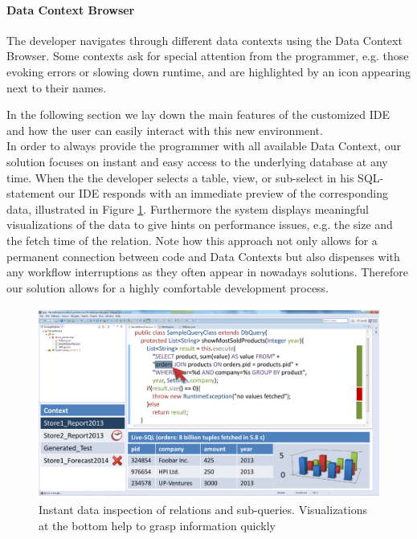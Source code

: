 \paragraph{Data Context Browser} The developer navigates through different data contexts using the Data Context Browser. Some contexts ask for special attention from the programmer, e.g. those evoking errors or slowing down runtime, and are highlighted by an icon appearing next to their names. %

In the following section we lay down the main features of the customized IDE and how the user can easily interact with this new environment.\\
In order to always provide the programmer with all available Data Context, our solution focuses on instant and easy access to the underlying database at any time. When the the developer selects a table, view, or sub-select in his SQL-statement our IDE responds with an immediate preview of the corresponding data, illustrated in Figure \ref{fig:final_prototype_instant}. Furthermore the system displays meaningful visualizations of the data to give hints on performance issues, e.g. the size and the fetch time of the relation. Note how this approach not only allows for a permanent connection between code and Data Contexts but also dispenses with any workflow interruptions as they often appear in nowadays solutions. Therefore our solution allows for a highly comfortable development process.\\
\begin{figure}
\begin{centering}
    \includegraphics[width=1.0\linewidth]{images/instant}
    \caption{Instant data inspection of relations and sub-queries. Visualizations at the bottom help to grasp information quickly}
    \label{fig:final_prototype_instant}
\end{centering}
\end{figure}
